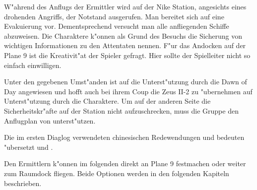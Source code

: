 \begin{remarks}
	W"ahrend des Anflugs der Ermittler wird auf der Nike Station, angesichts eines drohenden Angriffs, der Notstand ausgerufen. Man bereitet sich auf eine Evakuierung vor. Dementsprechend versucht man alle anfliegenden Schiffe abzuweisen. Die Charaktere k"onnen als Grund des Besuchs die Sicherung von wichtigen Informationen zu den Attentaten nennen. F"ur das Andocken auf der Plane 9 ist die Kreativit"at der Spieler gefragt. Hier sollte der Spielleiter nicht so einfach einwilligen.

	Unter den gegebenen Umst"anden ist \xl{} auf die Unterst"utzung durch die Dawn of Day angewiesen und hofft auch bei ihrem Coup die Zeus II-2 zu "ubernehmen auf Unterst"utzung durch die Charaktere. Um auf der anderen Seite die Sicherheitskr"afte auf der Station nicht aufzuschrecken, muss die Gruppe den Anflugplan von \xl{} unterst"utzen.

	Die im ersten Diaglog verwendeten chinesischen Redewendungen  und   bedeuten "ubersetzt  und .

	Den Ermittlern k"onnen im folgenden direkt an Plane 9 festmachen oder weiter zum Raumdock fliegen. Beide Optionen werden in den folgenden Kapiteln beschrieben.
\end{remarks}
